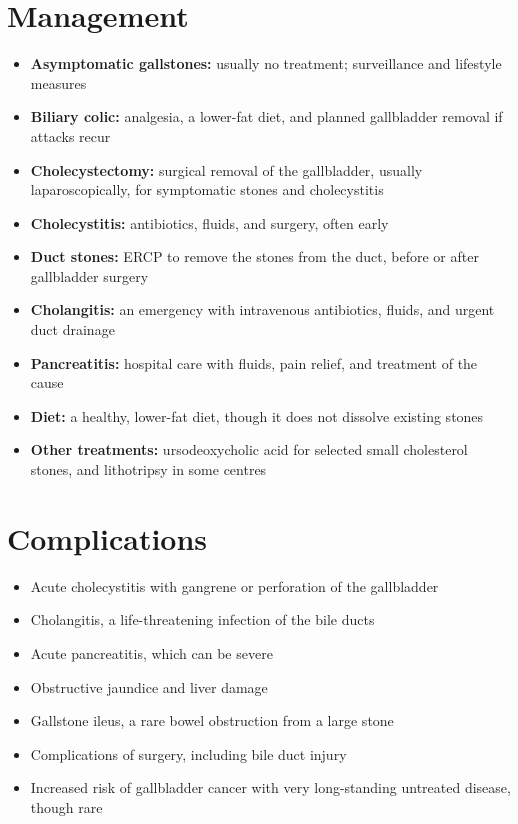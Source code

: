 \section*{Management}
\begin{itemize}
    \item \textbf{Asymptomatic gallstones:} usually no treatment; surveillance and lifestyle measures
    \item \textbf{Biliary colic:} analgesia, a lower-fat diet, and planned gallbladder removal if attacks recur
    \item \textbf{Cholecystectomy:} surgical removal of the gallbladder, usually laparoscopically, for symptomatic stones and cholecystitis
    \item \textbf{Cholecystitis:} antibiotics, fluids, and surgery, often early
    \item \textbf{Duct stones:} ERCP to remove the stones from the duct, before or after gallbladder surgery
    \item \textbf{Cholangitis:} an emergency with intravenous antibiotics, fluids, and urgent duct drainage
    \item \textbf{Pancreatitis:} hospital care with fluids, pain relief, and treatment of the cause
    \item \textbf{Diet:} a healthy, lower-fat diet, though it does not dissolve existing stones
    \item \textbf{Other treatments:} ursodeoxycholic acid for selected small cholesterol stones, and lithotripsy in some centres
\end{itemize}

\section*{Complications}
\begin{itemize}
    \item Acute cholecystitis with gangrene or perforation of the gallbladder
    \item Cholangitis, a life-threatening infection of the bile ducts
    \item Acute pancreatitis, which can be severe
    \item Obstructive jaundice and liver damage
    \item Gallstone ileus, a rare bowel obstruction from a large stone
    \item Complications of surgery, including bile duct injury
    \item Increased risk of gallbladder cancer with very long-standing untreated disease, though rare
\end{itemize}

